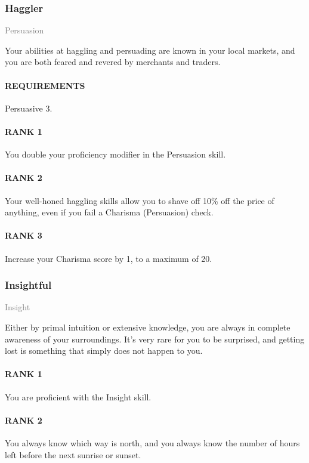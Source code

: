 \subsubsection{Haggler} \label{feat::haggler}
\small{\textcolor{gray}{Persuasion}}

\normalsize
Your abilities at haggling and persuading are known in your local markets, and you are both feared and revered by merchants and traders.
\paragraph{REQUIREMENTS} Persuasive 3.
\paragraph{RANK 1} You double your proficiency modifier in the Persuasion skill.
\paragraph{RANK 2} Your well-honed haggling skills allow you to shave off 10\% off the price of anything, even if you fail a Charisma (Persuasion) check.
\paragraph{RANK 3} Increase your Charisma score by 1, to a maximum of 20.

\subsubsection{Insightful} \label{feat::insightful}
\small{\textcolor{gray}{Insight}}

\normalsize
Either by primal intuition or extensive knowledge, you are always in complete awareness of your surroundings.
It's very rare for you to be surprised, and getting lost is something that simply does not happen to you.
\paragraph{RANK 1} You are proficient with the Insight skill.
\paragraph{RANK 2} You always know which way is north, and you always know the number of hours left before the next sunrise or sunset.
